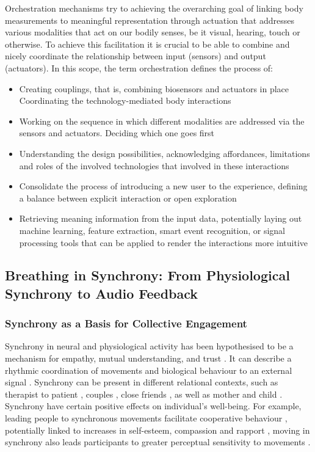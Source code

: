Orchestration mechanisms try to achieving the overarching goal of linking body measurements to meaningful representation through actuation that addresses various modalities that act on our bodily senses, be it visual, hearing, touch or otherwise. To achieve this facilitation it is crucial to be able to combine and nicely coordinate the relationship between input (sensors) and output (actuators). In this scope, the term orchestration defines the process of: 
\begin{itemize}
    \item Creating couplings, that is, combining biosensors and actuators in place 
    Coordinating the technology-mediated body interactions 
    \item Working on the sequence in which different modalities are addressed via the sensors and actuators. Deciding which one goes first 
    \item Understanding the design possibilities, acknowledging affordances, limitations and roles of the involved technologies that involved in these interactions 
    \item Consolidate the process of introducing a new user to the experience, defining a balance between explicit interaction or open exploration
    \item Retrieving meaning information from the input data, potentially laying out machine learning, feature extraction, smart event recognition, or signal processing tools that can be applied to render the interactions more intuitive
\end{itemize}

\subsection{Breathing in Synchrony: From Physiological Synchrony to Audio Feedback}

\subsubsection{Synchrony as a Basis for Collective Engagement}

Synchrony in neural and physiological activity has been hypothesised to be a mechanism for empathy, mutual understanding, and trust \cite{wallot_beyond_2016}. It can describe a rhythmic coordination of movements and biological behaviour to an external signal \cite{koole_synchrony_2016}. Synchrony can be present in different relational contexts, such as therapist to patient \cite{koole_synchrony_2016}, couples \cite{karvonen_sympathetic_2016}, close friends \cite{miles_birds_2011}, as well as mother and child \cite{butler_emotional_2013}. Synchrony have certain positive effects on individual’s well-being. For example, leading people to synchronous movements facilitate cooperative behaviour \cite{kirschner_joint_2010}, potentially linked to increases in self-esteem, compassion and rapport \cite{lumsden_sync_2014, fujiwara_rhythmic_2020}, moving in synchrony also leads participants to greater perceptual sensitivity to movements \cite{zamm_endogenous_2016}.

